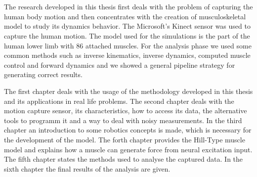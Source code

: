 \section*{\texorpdfstring{}{}}

\en
The research developed in this thesis first deals with the problem of capturing the human body motion and then concentrates with the creation of musculoskeletal model to study its dynamics behavior. The Microsoft's Kinect sensor was used to capture the human motion. The model used for the simulations is the part of the human lower limb with 86 attached muscles. For the analysis phase we used some common methods such as inverse kinematics, inverse dynamics, computed muscle control and forward dynamics and we showed a general pipeline strategy for generating correct results.

The first chapter deals with the usage of the methodology developed in this thesis and its applications in real life problems. The second chapter deals with the motion capture sensor, its characteristics, how to access its data, the alternative tools to programm it and a way to deal with noisy measurements. In the third chapter an introduction to some robotics concepts is made, which is necessary for the development of the model. The forth chapter provides the Hill-Type muscle model and explains how a muscle can generate force from neural excitation input. The fifth chapter states the methods used to analyse the captured data. In the sixth chapter the final results of the analysis are given.
\gr

\vfill

\paragraph{\textbf{}}

\thispagestyle{empty}
\clearpage\mbox{}
\thispagestyle{empty} 